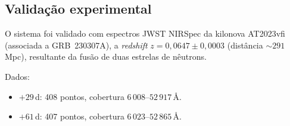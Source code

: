 \documentclass[12pt,a4paper]{article}
\begin{document}
\subsection{Validação experimental}

O sistema foi validado com espectros JWST NIRSpec da kilonova
AT2023vfi (associada a GRB~230307A), a \textit{redshift}
$z = 0{,}0647 \pm 0{,}0003$ (distância $\sim 291$\,Mpc),
resultante da fusão de duas estrelas de nêutrons.

Dados:
\begin{itemize}[leftmargin=*]
\item $+29$\,d: 408 pontos, cobertura $6\,008$--$52\,917$\,\AA.
\item $+61$\,d: 407 pontos, cobertura $6\,023$--$52\,865$\,\AA.
\end{itemize}
\end{document}

